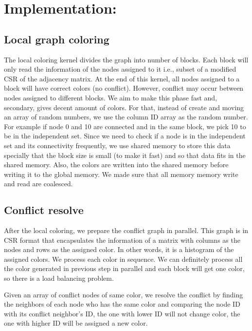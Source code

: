 \documentclass[12pt] {article}
\begin{document}
\section*{Implementation:}

\subsection*{Local graph coloring}
The local coloring kernel divides the graph into number of blocks. Each block will only read the information of the nodes assigned to it i.e., subset of a modified CSR of the adjacency matrix. At the end of this kernel, all nodes assigned to a block will have correct colors (no conflict). However, conflict may occur between nodes assigned to different blocks. We aim to make this phase fast and, secondary, gives decent amount of colors. For that, instead of create and moving an array of random numbers, we use the column ID array as the random number. For example if node 0 and 10 are connected and in the same block, we pick 10 to be in the independent set. Since we need to check if a node is in the independent set and its connectivity frequently, we use shared memory  to store this data specially that the block size is small (to make it fast) and so that data fits in the shared memory. Also, the colors are written into the shared memory before writing it to the global memory. We made sure that all memory memory write and read are coalesced. 
\subsection*{Conflict resolve}
After the local coloring, we prepare the conflict graph in parallel. This graph is in CSR format that encapsulates the information of a matrix with columns as the nodes and rows as the assigned color. In other words, it is a histogram of the assigned colors. We process each color in sequence. We can definitely process all the color generated in previous step in parallel and each block will get one color, so there is a load balancing problem. %

Given an array of conflict nodes of same color, we resolve the conflict by finding the neighbors of each node who has the same color and comparing the node ID with its conflict neighbor's ID, the one with lower ID will not change color, the one with higher ID will be assigned a new color. 
\end{document}
